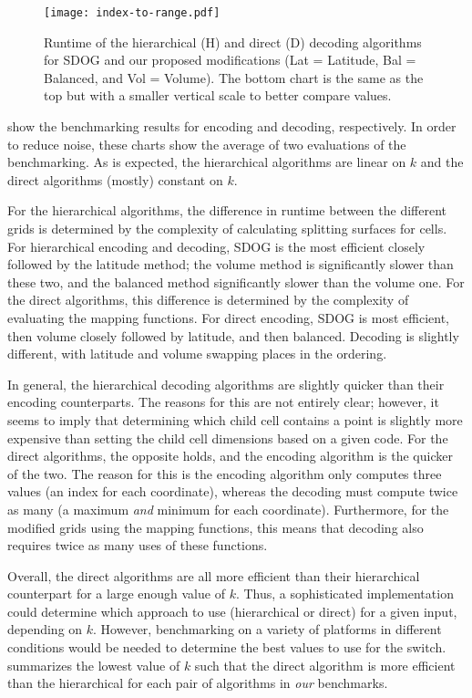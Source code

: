 \begin{figure}[htp!]
	\centering
	\texttt{[image: index-to-range.pdf]}
	\caption[Runtime comparison of SDOG decoding algorithms]{
		Runtime of the hierarchical (H) and direct (D) decoding algorithms for SDOG and our proposed modifications (Lat = Latitude, Bal = Balanced, and Vol = Volume).
		The bottom chart is the same as the top but with a smaller vertical scale to better compare values.
	}
	\label{fig:index-to-range}
\end{figure}


 show the benchmarking results for encoding and decoding, respectively.
In order to reduce noise, these charts show the average of two evaluations of the benchmarking.
As is expected, the hierarchical algorithms are linear on $k$ and the direct algorithms (mostly) constant on $k$.


For the hierarchical algorithms, the difference in runtime between the different grids is determined by the complexity of calculating splitting surfaces for cells.
For hierarchical encoding and decoding, SDOG is the most efficient closely followed by the latitude method; the volume method is significantly slower than these two, and the balanced method significantly slower than the volume one.
For the direct algorithms, this difference is determined by the complexity of evaluating the mapping functions.
For direct encoding, SDOG is most efficient, then volume closely followed by latitude, and then balanced.
Decoding is slightly different, with latitude and volume swapping places in the ordering.


In general, the hierarchical decoding algorithms are slightly quicker than their encoding counterparts.
The reasons for this are not entirely clear; however, it seems to imply that determining which child cell contains a point is slightly more expensive than setting the child cell dimensions based on a given code.
For the direct algorithms, the opposite holds, and the encoding algorithm is the quicker of the two.
The reason for this is the encoding algorithm only computes three values (an index for each coordinate), whereas the decoding must compute twice as many (a maximum \textit{and} minimum for each coordinate).
Furthermore, for the modified grids using the mapping functions, this means that decoding also requires twice as many uses of these functions.


Overall, the direct algorithms are all more efficient than their hierarchical counterpart for a large enough value of $k$.
Thus, a sophisticated implementation could determine which approach to use (hierarchical or direct) for a given input, depending on $k$.
However, benchmarking on a variety of platforms in different conditions would be needed to determine the best values to use for the switch.
 summarizes the lowest value of $k$ such that the direct algorithm is more efficient than the hierarchical for each pair of algorithms in \textit{our} benchmarks.


